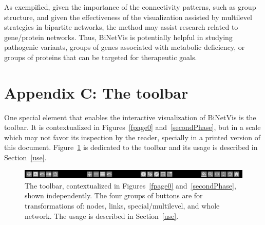 \documentclass[runningheads]{llncs}
\begin{document}
As exempified,
given the importance of the connectivity patterns,
such as group structure,
and given the effectiveness of the visualization assisted by multilevel strategies in bipartite networks,
the method may assist research related to gene/protein networks.
Thus, BiNetVis is potentially helpful in studying pathogenic variants,
groups of genes associated with metabolic deficiency,
or groups of proteins that can be targeted for therapeutic goals.

\FloatBarrier
\section*{Appendix C: The toolbar}
One special element that enables the interactive visualization of BiNetVis is the toolbar. It is contextualized in Figures~\ref{fpage0} and~\ref{secondPhase},
but in a scale which may not favor its inspection by the reader, specially in a printed version of this document.
Figure~\ref{toolbar} is dedicated to the toolbar and its usage is described in Section~\ref{use}.


\begin{figure}\centering
 \includegraphics[width=\textwidth]{toolbar}
  \caption{The toolbar, contextualized in Figures~\ref{fpage0} and~\ref{secondPhase}, shown independently. The four groups of buttons are for transformations of: nodes, links, special/multilevel, and whole network. The usage is described in Section~\ref{use}.}\label{toolbar}
\end{figure}
\end{document}
